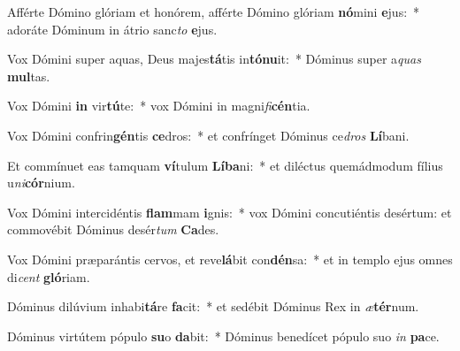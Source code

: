 \item Afférte Dómino glóriam et honórem, afférte Dómino glóriam \textbf{nó}mini \textbf{e}jus:~* adoráte Dóminum in átrio sanc\textit{to} \textbf{e}jus.
\item Vox Dómini super aquas, Deus majes\textbf{tá}tis in\textbf{tó}\textbf{nu}it:~* Dóminus super a\textit{quas} \textbf{mul}tas.
\item Vox Dómini \textbf{in} vir\textbf{tú}te:~* vox Dómini in magni\textit{fi}\textbf{cén}tia.
\item Vox Dómini confrin\textbf{gén}tis \textbf{ce}dros:~* et confrínget Dóminus ce\textit{dros} \textbf{Lí}bani.
\item Et commínuet eas tamquam \textbf{ví}tulum \textbf{Lí}\textbf{ba}ni:~* et diléctus quemádmodum fílius u\textit{ni}\textbf{cór}nium.
\item Vox Dómini intercidéntis \textbf{flam}mam \textbf{i}gnis:~* vox Dómini concutiéntis desértum: et commovébit Dóminus desér\textit{tum} \textbf{Ca}des.
\item Vox Dómini præparántis cervos, et reve\textbf{lá}bit con\textbf{dén}sa:~* et in templo ejus omnes di\textit{cent} \textbf{gló}riam.
\item Dóminus dilúvium inhabi\textbf{tá}re \textbf{fa}cit:~* et sedébit Dóminus Rex in \textit{æ}\textbf{tér}num.
\item Dóminus virtútem pópulo \textbf{su}o \textbf{da}bit:~* Dóminus benedícet pópulo suo \textit{in} \textbf{pa}ce.
